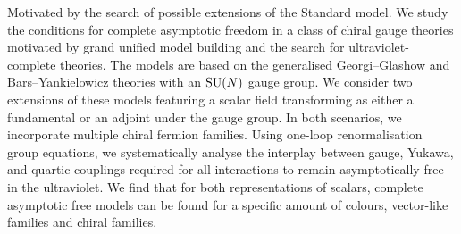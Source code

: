 Motivated by the search of possible extensions of the Standard model. We study the conditions for complete asymptotic freedom in a class of chiral gauge theories motivated by grand unified model building and the search for ultraviolet-complete theories. The models are based on the generalised Georgi--Glashow and Bars--Yankielowicz theories with an $\mathrm{SU}(N)$ gauge group. We consider two extensions of these models featuring a scalar field transforming as either a fundamental or an adjoint under the gauge group. In both scenarios, we incorporate multiple chiral fermion families. Using one-loop renormalisation group equations, we systematically analyse the interplay between gauge, Yukawa, and quartic couplings required for all interactions to remain asymptotically free in the ultraviolet. We find that for both representations of scalars, complete asymptotic free models can be found for a specific amount of colours, vector-like families and chiral families. 